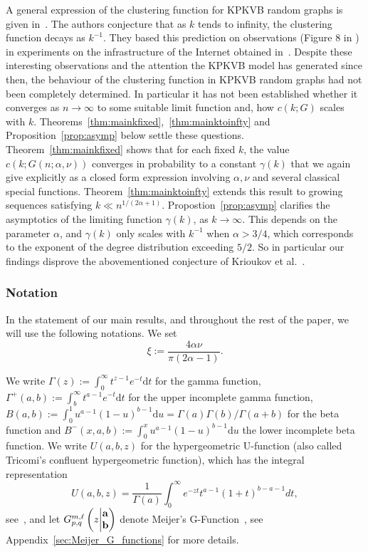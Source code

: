A general expression of the clustering function for KPKVB random graphs is given in~\cite[Equation (59)]{krioukov2010hyperbolic}. 
The authors conjecture that as $k$ tends to infinity, the clustering function decays as $k^{-1}$. They based this prediction 
on observations (Figure 8 in \cite{krioukov2010hyperbolic}) in experiments on the infrastructure of the Internet obtained 
in~\cite{claffy2009internet}. 
Despite these interesting observations and the attention
the KPKVB model has generated since then, the behaviour of the clustering function in 
KPKVB random graphs had not been completely determined. In particular it has not been established whether it converges as $n\to\infty$ to some suitable limit function and, 
how $c(k;G)$ scales with $k$.
Theorems~\ref{thm:mainkfixed},~\ref{thm:mainktoinfty} and Proposition~\ref{prop:asymp} below settle these questions.
Theorem~\ref{thm:mainkfixed} shows that for each fixed $k$, the value $c(k;G(n;\alpha,\nu))$ converges in probability to 
a constant $\gamma(k)$ that we again give explicitly as a closed form expression involving $\alpha,\nu$ and several classical special functions.
Theorem~\ref{thm:mainktoinfty} extends this result to growing sequences satisfying $k \ll n^{1/(2\alpha+1)}$.
Propostion~\ref{prop:asymp} clarifies the asymptotics of the limiting function $\gamma(k)$, as $k\to\infty$.
This depends on the parameter $\alpha$, and $\gamma(k)$ only scales with $k^{-1}$ when $\alpha > 3/4$, 
which corresponds to the exponent of the degree distribution exceeding $5/2$. 
So in particular our findings disprove the abovementioned conjecture of Krioukov et al.~\cite{krioukov2010hyperbolic}.


\subsubsection*{Notation}

In the statement of our main results, and throughout the rest of the paper, we will use the following notations. 
We set 
$$\xi := \frac{4\alpha\nu}{\pi(2\alpha-1)}. $$

We write $\Gamma(z) := \int_0^\infty t^{z-1} e^{-t}\text{d}t$ for the gamma function, 
$\Gamma^+(a,b) := \int_b^\infty t^{a-1} e^{-t}\text{d}t$ for the upper incomplete gamma function, 
 $B(a,b) := \int_0^1 u^{a-1}(1-u)^{b-1}\text{d}u = \Gamma(a)\Gamma(b) / \Gamma(a+b)$ for the beta function and 
 $B^-(x,a,b) := \int_0^x u^{a-1}(1-u)^{b-1}\text{d}u$ the lower incomplete beta function. 
We write $U(a,b,z)$ for the hypergeometric U-function (also called Tricomi's confluent hypergeometric function), which 
has the integral representation 
\[
	U(a,b,z) = \frac{1}{\Gamma(a)} \int_0^\infty e^{-zt} t^{a-1} (1+t)^{b-a-1} dt,
\] 
see~\cite[p.255 Equation (2)]{erdelyi1953higher}, and let $\MeijerGnew{m}{\ell}{p}{q}{{\bf a}}{{\bf b}}{z}$ denote 
Meijer's G-Function~\cite{meijer1946gfunction}, see Appendix~\ref{sec:Meijer_G_functions} for more details.


